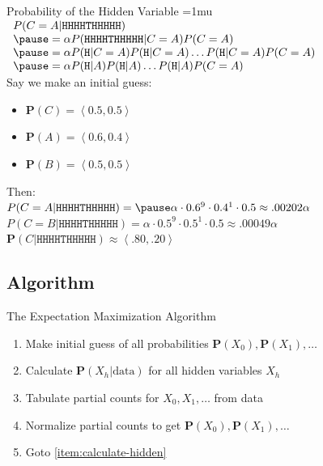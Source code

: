 \documentclass[14pt]{beamer}
\begin{document}
\begin{frame}{Probability of the Hidden Variable}
\thickmuskip=1mu
$\begin{array}{ l }
P(C=A|\texttt{HHHHTHHHHH}) \\
\pause
= \alpha P(\texttt{HHHHTHHHHH}|C=A) P(C=A) \\
\pause
= \alpha P(\texttt{H}|C=A) P(\texttt{H}|C=A) \ldots P(\texttt{H}|C=A) P(C=A) \\
\pause
= \alpha P(\texttt{H}|A) P(\texttt{H}|A) \ldots P(\texttt{H}|A) P(C=A) \\
\end{array}$\\
\bigskip
\pause
Say we make an initial guess:
\begin{itemize}
\item $\mathbf{P}(C) = \left\langle 0.5, 0.5\right\rangle$
\item $\mathbf{P}(A) = \left\langle 0.6, 0.4\right\rangle$
\item $\mathbf{P}(B) = \left\langle 0.5, 0.5\right\rangle$
\end{itemize}
Then:\\
$P(C=A|\texttt{HHHHTHHHHH}) = \pause \alpha \cdot 0.6^{9} \cdot 0.4^{1} \cdot 0.5 \approx .00202 \alpha$ \\
\pause
$P(C=B|\texttt{HHHHTHHHHH}) = \alpha \cdot 0.5^{9} \cdot 0.5^{1} \cdot 0.5 \approx .00049 \alpha$ \\
\pause
$\mathbf{P}(C|\texttt{HHHHTHHHHH}) \approx \left\langle .80, .20 \right\rangle$
\end{frame}

\subsection{Algorithm}

\begin{frame}{The Expectation Maximization Algorithm}
\begin{enumerate}
\item Make initial guess of all probabilities $\mathbf{P}(X_0), \mathbf{P}(X_1), \ldots$
\item\label{item:calculate-hidden} Calculate $\mathbf{P}(X_h|\text{data})$ for all hidden variables $X_h$
\item Tabulate partial counts for $X_0, X_1, \ldots$ from data
\item Normalize partial counts to get $\mathbf{P}(X_0), \mathbf{P}(X_1), \ldots$
\item Goto \ref{item:calculate-hidden}
\end{enumerate}
\end{frame}
\end{document}
